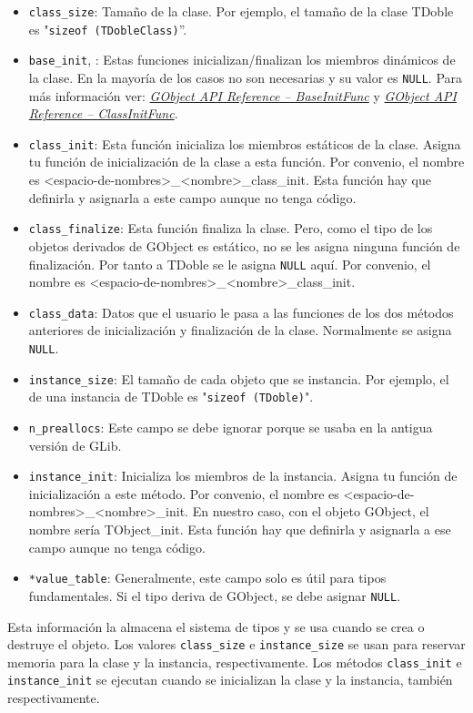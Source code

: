 \begin{itemize}
  \tightlist
\item \texttt{class\_size}: Tamaño de la clase. Por ejemplo, el tamaño de la clase
  \textsf{TDoble} es "\texttt{sizeof (TDobleClass)}''.
\item \texttt{base\_init}, : Estas funciones inicializan/finalizan
  los miembros dinámicos de la clase. En la mayoría de los casos no son necesarias y
  su valor es \texttt{NULL}.
  Para más información ver:
  \href{https://docs.gtk.org/gobject/callback.BaseInitFunc.html}
  {\textit{GObject API Reference -- BaseInitFunc}} y
  \href{https://docs.gtk.org/gobject/callback.ClassInitFunc.html}
  {\textit{GObject API Reference -- ClassInitFunc}}.
\item \texttt{class\_init}: Esta función inicializa los miembros estáticos de la clase. Asigna tu función de
  inicialización de la clase a esta función.
  Por convenio, el nombre es \textsf{<espacio-de-nombres>\_<nombre>\_class\_init}.
  Esta función hay que definirla y asignarla a este campo aunque no tenga código.
\item \texttt{class\_finalize}: Esta función finaliza la clase. Pero, como el tipo de los objetos derivados de
  \textsf{GObject} es estático, no se les asigna ninguna función de finalización. Por tanto a \textsf{TDoble}
  se le asigna \texttt{NULL} aquí.
  Por convenio, el nombre es \textsf{<espacio-de-nombres>\_<nombre>\_class\_init}.
\item \texttt{class\_data}: Datos que el usuario le pasa a las funciones de los dos métodos anteriores
  de inicialización y finalización de la clase. Normalmente se asigna \texttt{NULL}.
\item \texttt{instance\_size}: El tamaño de cada objeto que se instancia. Por ejemplo, el de una instancia
  de \textsf{TDoble} es "\texttt{sizeof (TDoble)}".
\item \texttt{n\_preallocs}: Este campo se debe ignorar porque se usaba en la antigua versión de \textsf{GLib}.
\item \texttt{instance\_init}: Inicializa los miembros de la instancia. Asigna tu función de inicialización a este
  método. Por convenio, el nombre es \textsf{<espacio-de-nombres>\_<nombre>\_init}. En nuestro caso, con
  el objeto \textsf{GObject}, el nombre sería \textsf{TObject\_init}.
  Esta función hay que definirla y asignarla a ese campo aunque no tenga código.
\item \texttt{*value\_table}:  Generalmente, este campo solo es útil para tipos fundamentales. Si el tipo deriva
  de \textsf{GObject}, se debe asignar \texttt{NULL}.
\end{itemize}
Esta información la almacena el sistema de tipos y se usa cuando se crea o destruye el objeto.
Los valores \texttt{class\_size} e \texttt{instance\_size} se usan para reservar memoria para la clase y la instancia,
respectivamente. Los métodos \texttt{class\_init} e \texttt{instance\_init} se ejecutan cuando se inicializan
la clase y la instancia, también respectivamente.

